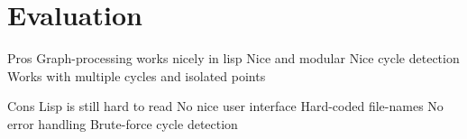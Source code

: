 \chapter{Evaluation}

  Pros
    Graph-processing works nicely in lisp
    Nice and modular
    Nice cycle detection
    Works with multiple cycles and isolated points
    
  Cons
    Lisp is still hard to read
    No nice user interface
    Hard-coded file-names
    No error handling
    Brute-force cycle detection
 
